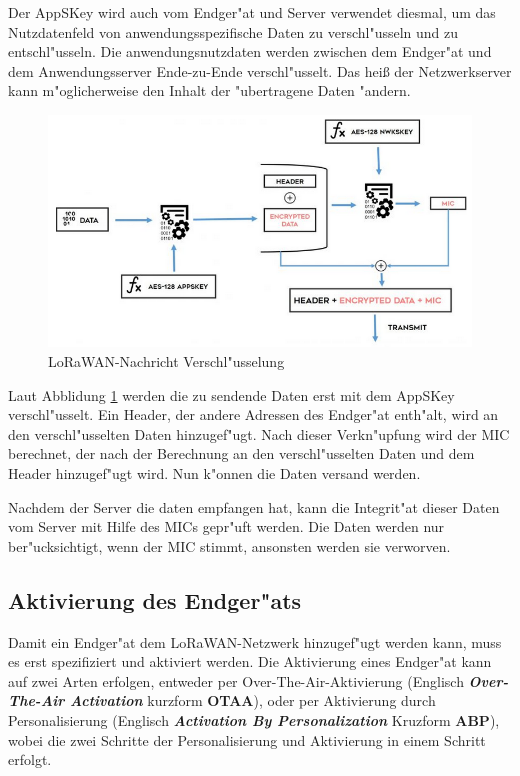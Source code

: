 Der AppSKey wird auch vom Endger"at und Server verwendet diesmal, um das 
Nutzdatenfeld von anwendungsspezifische Daten zu verschl"usseln und zu 
entschl"usseln. Die anwendungsnutzdaten werden zwischen dem Endger"at 
und dem Anwendungsserver Ende-zu-Ende verschl"usselt. Das hei\ss{} der 
Netzwerkserver kann m"oglicherweise den Inhalt der "ubertragene Daten 
"andern. 

\begin{figure}[h]
	\centering
	\includegraphics[width=14cm]{source/images/WAN}
	\caption{LoRaWAN-Nachricht Verschl"usselung 
		\cite{Entcription}\label{fig:Entcription}}
\end{figure}

Laut Abblidung \ref{fig:Entcription} werden die zu sendende Daten erst 
mit dem AppSKey verschl"usselt. Ein Header, der andere Adressen des 
Endger"at enth"alt, wird an den verschl"usselten Daten hinzugef"ugt. 
Nach dieser Verkn"upfung wird der MIC berechnet, der nach der Berechnung 
an den verschl"usselten Daten und dem Header hinzugef"ugt wird. Nun 
k"onnen die Daten versand werden. 

Nachdem der Server die daten empfangen hat, kann die Integrit"at dieser 
Daten vom Server mit Hilfe des MICs gepr"uft werden. Die Daten werden 
nur ber"ucksichtigt, wenn der MIC stimmt, ansonsten werden sie 
verworven.  

\vspace{5cm}
\subsection{Aktivierung des Endger"ats}
Damit ein Endger"at dem LoRaWAN-Netzwerk hinzugef"ugt werden kann, muss 
es erst spezifiziert und aktiviert werden. Die Aktivierung eines 
Endger"at kann auf zwei Arten erfolgen, entweder per 
Over-The-Air-Aktivierung (Englisch \textbf{\textit{Over-The-Air 
Activation}} kurzform \textbf{OTAA}), oder per Aktivierung durch 
Personalisierung (Englisch \textbf{\textit{Activation By 
Personalization}} Kruzform \textbf{ABP}), wobei die zwei Schritte der 
Personalisierung und Aktivierung in einem Schritt erfolgt. 

